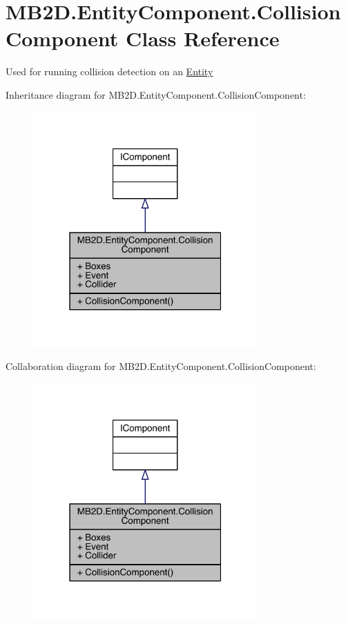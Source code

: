 \hypertarget{class_m_b2_d_1_1_entity_component_1_1_collision_component}{}\section{M\+B2\+D.\+Entity\+Component.\+Collision\+Component Class Reference}
\label{class_m_b2_d_1_1_entity_component_1_1_collision_component}


Used for running collision detection on an \hyperlink{class_m_b2_d_1_1_entity_component_1_1_entity}{Entity}  




Inheritance diagram for M\+B2\+D.\+Entity\+Component.\+Collision\+Component\+:\nopagebreak
\begin{figure}[H]
\begin{center}
\leavevmode
\includegraphics[width=244pt]{class_m_b2_d_1_1_entity_component_1_1_collision_component__inherit__graph}
\end{center}
\end{figure}


Collaboration diagram for M\+B2\+D.\+Entity\+Component.\+Collision\+Component\+:\nopagebreak
\begin{figure}[H]
\begin{center}
\leavevmode
\includegraphics[width=244pt]{class_m_b2_d_1_1_entity_component_1_1_collision_component__coll__graph}
\end{center}
\end{figure}
